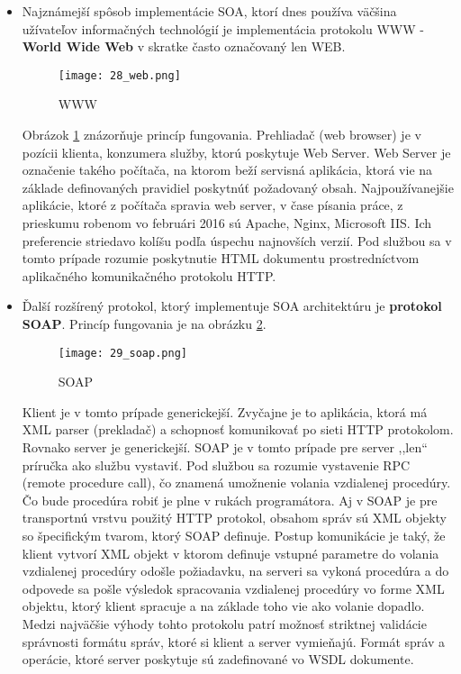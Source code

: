 \begin{itemize}
 \item Najznámejší spôsob implementácie SOA, ktorí dnes používa väčšina užívateľov informačných technológií je implementácia protokolu WWW - \textbf{World Wide Web} v skratke často označovaný len WEB. 
\begin{figure}[!htbp]
\centering
\texttt{[image: 28\_web.png]}
\caption{WWW \cite{IOT14}}
\label{28_web}
\end{figure} 
Obrázok \ref{28_web} znázorňuje princíp fungovania. Prehliadač (web browser) je v pozícii klienta, konzumera služby, ktorú poskytuje Web Server. Web Server je označenie takého počítača, na ktorom beží servisná aplikácia, ktorá vie na základe definovaných pravidiel poskytnúť požadovaný obsah. Najpoužívanejšie aplikácie, ktoré z počítača spravia web server,  v čase písania práce, z prieskumu robenom vo februári 2016 \cite{IOT15} sú Apache, Nginx, Microsoft IIS. Ich preferencie striedavo kolíšu podľa úspechu najnovších verzií. Pod službou sa v tomto prípade rozumie poskytnutie HTML dokumentu prostredníctvom aplikačného komunikačného protokolu HTTP.
\item Ďalší rozšírený protokol, ktorý implementuje SOA architektúru je \textbf{protokol SOAP}. Princíp fungovania je na obrázku \ref{29_soap}.
\begin{figure}[!htbp]
\centering
\texttt{[image: 29\_soap.png]}
\caption{SOAP \cite{IOT14}}
\label{29_soap}
\end{figure} 
Klient je v tomto prípade generickejší. Zvyčajne je to aplikácia, ktorá má XML parser (prekladač) a schopnosť komunikovať po sieti HTTP protokolom. Rovnako server je generickejší. SOAP je v tomto prípade pre server ,,len`` príručka ako službu vystaviť. Pod službou sa rozumie vystavenie RPC (remote procedure call), čo znamená umožnenie volania vzdialenej procedúry. Čo bude procedúra robiť je plne v rukách programátora. Aj v SOAP je pre transportnú vrstvu použitý HTTP protokol, obsahom správ sú XML objekty so špecifickým tvarom, ktorý SOAP definuje. Postup komunikácie je taký, že klient vytvorí XML objekt v ktorom definuje vstupné parametre do volania vzdialenej procedúry odošle požiadavku, na serveri sa vykoná procedúra a do odpovede sa pošle výsledok spracovania vzdialenej procedúry vo forme XML objektu, ktorý klient spracuje a na základe toho vie ako volanie dopadlo. 
Medzi najväčšie výhody tohto protokolu patrí možnosť striktnej validácie správnosti formátu správ, ktoré si klient a server vymieňajú. Formát správ a operácie, ktoré server poskytuje sú zadefinované vo WSDL dokumente. 

\end{itemize}
